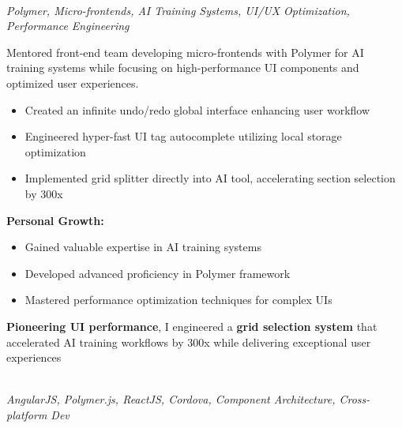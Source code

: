 \documentclass[a4paper,10pt]{article}
\begin{document}
\begin{minipage}{\textwidth}
    \noindent\uline{} \\
    \vspace{0.1cm} \hspace{0.2cm}
	{\small\textit{Polymer, Micro-frontends, AI Training Systems, UI/UX Optimization, Performance Engineering}}

    Mentored front-end team developing micro-frontends with Polymer for AI training systems while focusing on high-performance UI components and optimized user experiences.

	\vspace{0.2cm}
	\begin{itemize}[label=\textcolor{darkblue}{\textbullet}, leftmargin=*, nosep]
		\item Created an infinite undo/redo global interface enhancing user workflow
		\item Engineered hyper-fast UI tag autocomplete utilizing local storage optimization
		\item Implemented grid splitter directly into AI tool, accelerating section selection by 300x
	\end{itemize}

	\vspace{0.2cm}
	\textbf{Personal Growth:}
	\vspace{0.2cm}
	\begin{itemize}[label=\textcolor{darkblue}{\textbullet}, leftmargin=*, nosep]
		\item Gained valuable expertise in AI training systems
		\item Developed advanced proficiency in Polymer framework
		\item Mastered performance optimization techniques for complex UIs
	\end{itemize}

    \vspace{0.2cm}

    \textbf{Pioneering UI performance}, I engineered a \textbf{grid selection system} that accelerated AI training workflows by 300x while delivering exceptional user experiences

	\vspace{0.4cm}

\end{minipage}

    \noindent\uline{} \\
    \vspace{0cm} \hspace{0.2cm}
	{\small\textit{AngularJS, Polymer.js, ReactJS, Cordova, Component Architecture, Cross-platform Dev}}
\end{document}
